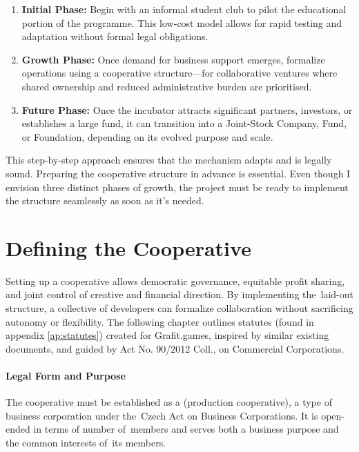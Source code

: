 \begin{enumerate}
    \item \textbf{Initial Phase:} Begin with an informal student club to pilot the educational portion of the programme. This low-cost model allows for rapid testing and adaptation without formal legal obligations.
    \item \textbf{Growth Phase:} Once demand for business support emerges, formalize operations using a cooperative structure—for collaborative ventures where shared ownership and reduced administrative burden are prioritised.
    \item \textbf{Future Phase:} Once the incubator attracts significant partners, investors, or establishes a large fund, it can transition into a Joint-Stock Company, Fund, or Foundation, depending on its evolved purpose and scale.
\end{enumerate}

This step-by-step approach ensures that the mechanism adapts and is legally sound. Preparing the cooperative structure in advance is essential. Even though I envision three distinct phases of growth, the project must be ready to implement the structure seamlessly as soon as it's needed.

\section{Defining the Cooperative}\label{sec:defining-coop}
Setting up a cooperative allows democratic governance, equitable profit sharing, and joint control of creative and financial direction. By implementing the~laid-out structure, a collective of developers can formalize collaboration without sacrificing autonomy or flexibility. The following chapter outlines statutes (found in appendix \ref{ap:statutes}) created for Grafit.games, inspired by similar existing documents\cite{drevojas, stanovy-brno}, and guided by Act No. 90/2012 Coll., on Commercial Corporations\cite{ZOK}.

\paragraph{Legal Form and Purpose}
The cooperative must be established as a  (production cooperative), a type of business corporation under the~Czech Act on Business Corporations. It is open-ended in terms of number of~members and serves both a business purpose and the common interests of~its members.

